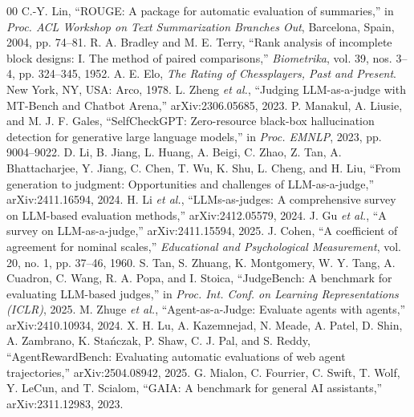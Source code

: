 \documentclass[conference]{IEEEtran}
\begin{document}
\begin{thebibliography}{00}
 C.-Y. Lin, ``ROUGE: A package for automatic evaluation of summaries,'' in \emph{Proc. ACL Workshop on Text Summarization Branches Out}, Barcelona, Spain, 2004, pp. 74--81.
 R. A. Bradley and M. E. Terry, ``Rank analysis of incomplete block designs: I. The method of paired comparisons,'' \emph{Biometrika}, vol. 39, nos. 3--4, pp. 324--345, 1952.
 A. E. Elo, \emph{The Rating of Chessplayers, Past and Present}. New York, NY, USA: Arco, 1978.
 L. Zheng \emph{et al.}, ``Judging LLM-as-a-judge with MT-Bench and Chatbot Arena,'' arXiv:2306.05685, 2023.
 P. Manakul, A. Liusie, and M. J. F. Gales, ``SelfCheckGPT: Zero-resource black-box hallucination detection for generative large language models,'' in \emph{Proc. EMNLP}, 2023, pp. 9004--9022.
 D. Li, B. Jiang, L. Huang, A. Beigi, C. Zhao, Z. Tan, A. Bhattacharjee, Y. Jiang, C. Chen, T. Wu, K. Shu, L. Cheng, and H. Liu, ``From generation to judgment: Opportunities and challenges of LLM-as-a-judge,'' arXiv:2411.16594, 2024.
 H. Li \emph{et al.}, ``LLMs-as-judges: A comprehensive survey on LLM-based evaluation methods,'' arXiv:2412.05579, 2024.
 J. Gu \emph{et al.}, ``A survey on LLM-as-a-judge,'' arXiv:2411.15594, 2025.
 J. Cohen, ``A coefficient of agreement for nominal scales,'' \emph{Educational and Psychological Measurement}, vol. 20, no. 1, pp. 37--46, 1960.
 S. Tan, S. Zhuang, K. Montgomery, W. Y. Tang, A. Cuadron, C. Wang, R. A. Popa, and I. Stoica, ``JudgeBench: A benchmark for evaluating LLM-based judges,'' in \emph{Proc. Int. Conf. on Learning Representations (ICLR)}, 2025.
 M. Zhuge \emph{et al.}, ``Agent-as-a-Judge: Evaluate agents with agents,'' arXiv:2410.10934, 2024.
 X. H. Lu, A. Kazemnejad, N. Meade, A. Patel, D. Shin, A. Zambrano, K. Sta\'nczak, P. Shaw, C. J. Pal, and S. Reddy, ``AgentRewardBench: Evaluating automatic evaluations of web agent trajectories,'' arXiv:2504.08942, 2025.
 G. Mialon, C. Fourrier, C. Swift, T. Wolf, Y. LeCun, and T. Scialom, ``GAIA: A benchmark for general AI assistants,'' arXiv:2311.12983, 2023.
\end{thebibliography}
\end{document}
